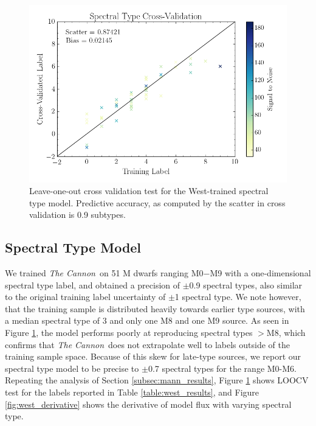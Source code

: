 \documentclass[twocolumn]{aastex62}
\newcommand{\thecannon}{\textsl{The Cannon}}
\begin{document}
\begin{figure}
	\begin{center}
	\includegraphics[width=\linewidth]{crv_test_spt.png}
	\end{center}
	\caption{Leave-one-out cross validation test for the West-trained spectral type model. Predictive accuracy, as computed by the scatter in cross validation is 0.9 subtypes.}
	\label{fig:west_validation}
\end{figure}

\subsection{Spectral Type Model \label{subsec:west_results}}

We trained \thecannon\ on 51 M dwarfs ranging \color{red}{\bf between }\color{black} M0$-$M9 with a one-dimensional spectral type label, and obtained a precision of $\pm$0.9 spectral types, also similar to the original training label uncertainty of $\pm$1 spectral type. We note however, that the training sample is distributed heavily towards earlier type sources, with a median spectral type of 3 and only one M8 and one M9 source. As seen in Figure \ref{fig:west_validation}, the model performs poorly at reproducing spectral types $>$M8, which confirms that \thecannon\ does not extrapolate well to labels outside of the training sample space. Because of this skew for late-type sources, we report our spectral type model to be precise to $\pm$0.7 spectral types for the range M0-M6. Repeating the analysis of Section \ref{subsec:mann_results}, Figure \ref{fig:west_validation} shows LOOCV test for the labels reported in Table \ref{table:west_results}, and Figure \ref{fig:west_derivative} shows the derivative of model flux with varying spectral type.
\end{document}
